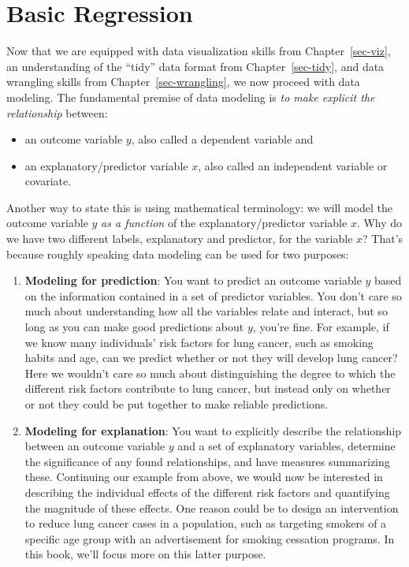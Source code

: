 \documentclass[
  letterpaper,
  DIV=11,
  numbers=noendperiod]{scrreprt}
\providecommand{\tightlist}{%
  \setlength{\itemsep}{0pt}\setlength{\parskip}{0pt}}\usepackage{longtable,booktabs,array}
\theoremstyle{definition}
\theoremstyle{remark}
\begin{document}
\hypertarget{sec-regression}{%
\chapter{Basic Regression}\label{sec-regression}}

Now that we are equipped with data visualization skills from
Chapter~\ref{sec-viz}, an understanding of the ``tidy'' data format from
Chapter~\ref{sec-tidy}, and data wrangling skills from
Chapter~\ref{sec-wrangling}, we now proceed with data modeling. The
fundamental premise of data modeling is \emph{to make explicit the
relationship} between:

\begin{itemize}
\tightlist
\item
  an outcome variable \(y\), also called a dependent variable and
\item
  an explanatory/predictor variable \(x\), also called an independent
  variable or covariate.
\end{itemize}

Another way to state this is using mathematical terminology: we will
model the outcome variable \(y\) \emph{as a function} of the
explanatory/predictor variable \(x\). Why do we have two different
labels, explanatory and predictor, for the variable \(x\)? That's
because roughly speaking data modeling can be used for two purposes:

\begin{enumerate}
\def\labelenumi{\arabic{enumi}.}
\item
  \textbf{Modeling for prediction}: You want to predict an outcome
  variable \(y\) based on the information contained in a set of
  predictor variables. You don't care so much about understanding how
  all the variables relate and interact, but so long as you can make
  good predictions about \(y\), you're fine. For example, if we know
  many individuals' risk factors for lung cancer, such as smoking habits
  and age, can we predict whether or not they will develop lung cancer?
  Here we wouldn't care so much about distinguishing the degree to which
  the different risk factors contribute to lung cancer, but instead only
  on whether or not they could be put together to make reliable
  predictions.
\item
  \textbf{Modeling for explanation}: You want to explicitly describe the
  relationship between an outcome variable \(y\) and a set of
  explanatory variables, determine the significance of any found
  relationships, and have measures summarizing these. Continuing our
  example from above, we would now be interested in describing the
  individual effects of the different risk factors and quantifying the
  magnitude of these effects. One reason could be to design an
  intervention to reduce lung cancer cases in a population, such as
  targeting smokers of a specific age group with an advertisement for
  smoking cessation programs. In this book, we'll focus more on this
  latter purpose.
\end{enumerate}
\end{document}
